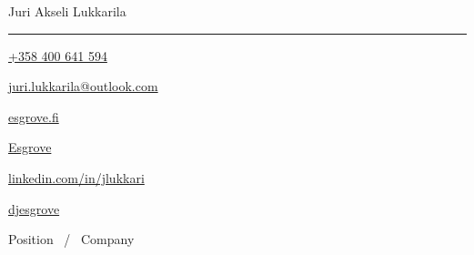 \documentclass[11pt,a4paper,oneside]{article}
\newcommand*{\logopic}[1]{
        \raisebox{-0.34\baselineskip}{ %
                \texttt{[image: \#1]}}
}
\begin{document}
\begin{minipage}{\textwidth}
        \raggedright
        \centering
        {\Huge \namefont \color{headcolor}{Cover} \color{textcolor}{Letter}} \hfill 
        {\huge \namefont Juri Akseli Lukkarila}
        \vspace{0.8mm}
        \rule[0.8mm]{\textwidth}{2pt}
        \fontsize{9pt}{9pt}\selectfont
        \hspace*{0.5mm}
        \logopic{call.pdf}      \thinspace \href{tel:+358400641594}{+358 400 641 594} \hfill
        \logopic{mail.pdf}      \thinspace \href{mailto:juri.lukkarila@outlook.com}{juri.lukkarila@outlook.com} \hfill
        \logopic{web.pdf}       \thinspace \href{http://www.esgrove.fi/}{esgrove.fi} \hfill
        \logopic{github.pdf}    \thinspace \href{https://github.com/Esgrove}{Esgrove} \hfill
        \logopic{linkedin.pdf}  \thinspace \href{https://www.linkedin.com/in/jlukkari/}{linkedin.com/in/jlukkari} \hfill
        \logopic{twitter.pdf}   \thinspace \href{https://twitter.com/djesgrove}{djesgrove}
        \hspace*{0.5mm}
\end{minipage}

\vspace{0.7cm}

\begin{center}
{\titledatefont \LARGE Position \ / \  Company} \\
\end{center}

\Blindtext
\end{document}
